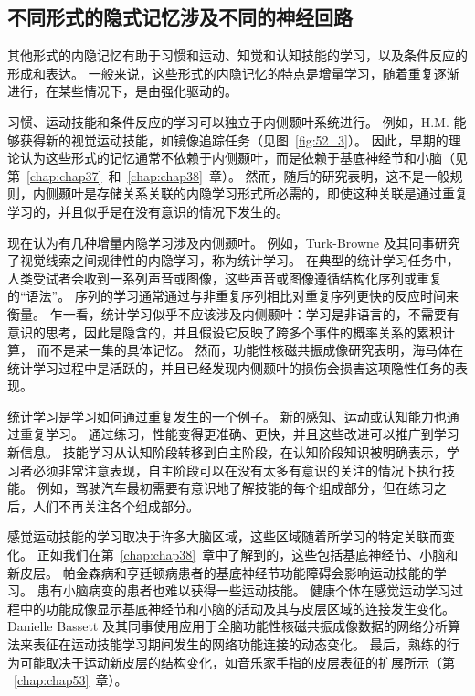 \subsection{不同形式的隐式记忆涉及不同的神经回路}

其他形式的内隐记忆有助于习惯和运动、知觉和认知技能的学习，以及条件反应的形成和表达。
一般来说，这些形式的内隐记忆的特点是增量学习，随着重复逐渐进行，在某些情况下，是由强化驱动的。


习惯、运动技能和条件反应的学习可以独立于内侧颞叶系统进行。
例如，H.M. 能够获得新的视觉运动技能，如镜像追踪任务（见图~\ref{fig:52_3}）。
因此，早期的理论认为这些形式的记忆通常不依赖于内侧颞叶，而是依赖于基底神经节和小脑（见第~\ref{chap:chap37}~和~\ref{chap:chap38}~章）。
然而，随后的研究表明，这不是一般规则，内侧颞叶是存储关系关联的内隐学习形式所必需的，即使这种关联是通过重复学习的，并且似乎是在没有意识的情况下发生的。


现在认为有几种增量内隐学习涉及内侧颞叶。
例如，Turk-Browne 及其同事研究了视觉线索之间规律性的内隐学习，称为统计学习。
在典型的统计学习任务中，人类受试者会收到一系列声音或图像，这些声音或图像遵循结构化序列或重复的“语法”。
序列的学习通常通过与非重复序列相比对重复序列更快的反应时间来衡量。
乍一看，统计学习似乎不应该涉及内侧颞叶：学习是非语言的，不需要有意识的思考，因此是隐含的，并且假设它反映了跨多个事件的概率关系的累积计算， 而不是某一集的具体记忆。
然而，功能性核磁共振成像研究表明，海马体在统计学习过程中是活跃的，并且已经发现内侧颞叶的损伤会损害这项隐性任务的表现。


统计学习是学习如何通过重复发生的一个例子。
新的感知、运动或认知能力也通过重复学习。
通过练习，性能变得更准确、更快，并且这些改进可以推广到学习新信息。
技能学习从认知阶段转移到自主阶段，在认知阶段知识被明确表示，学习者必须非常注意表现，自主阶段可以在没有太多有意识的关注的情况下执行技能。
例如，驾驶汽车最初需要有意识地了解技能的每个组成部分，但在练习之后，人们不再关注各个组成部分。


感觉运动技能的学习取决于许多大脑区域，这些区域随着所学习的特定关联而变化。
正如我们在第~\ref{chap:chap38}~章中了解到的，这些包括基底神经节、小脑和新皮层。
帕金森病和亨廷顿病患者的基底神经节功能障碍会影响运动技能的学习。
患有小脑病变的患者也难以获得一些运动技能。
健康个体在感觉运动学习过程中的功能成像显示基底神经节和小脑的活动及其与皮层区域的连接发生变化。
Danielle Bassett 及其同事使用应用于全脑功能性核磁共振成像数据的网络分析算法来表征在运动技能学习期间发生的网络功能连接的动态变化。
最后，熟练的行为可能取决于运动新皮层的结构变化，如音乐家手指的皮层表征的扩展所示（第 ~\ref{chap:chap53}~章）。


